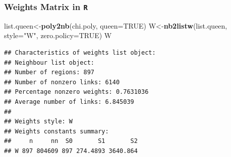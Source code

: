 \documentclass[
  shownotes,
  xcolor={svgnames},
  hyperref={colorlinks,citecolor=DarkBlue,linkcolor=DarkRed,urlcolor=DarkBlue}
  ]{beamer}
\newenvironment{Shaded}{\begin{snugshade}}{\end{snugshade}}
\newcommand{\DataTypeTok}[1]{\textcolor[rgb]{0.13,0.29,0.53}{#1}}
\newcommand{\KeywordTok}[1]{\textcolor[rgb]{0.13,0.29,0.53}{\textbf{#1}}}
\newcommand{\NormalTok}[1]{#1}
\newcommand{\OtherTok}[1]{\textcolor[rgb]{0.56,0.35,0.01}{#1}}
\newcommand{\StringTok}[1]{\textcolor[rgb]{0.31,0.60,0.02}{#1}}
\begin{document}
\begin{frame}[fragile]
\frametitle{Weights Matrix in \texttt{R}}


\begin{scriptsize}
\begin{Shaded}
\begin{Highlighting}[]
\NormalTok{list.queen\textless{}{-}}\KeywordTok{poly2nb}\NormalTok{(chi.poly, }\DataTypeTok{queen=}\OtherTok{TRUE}\NormalTok{)}
\NormalTok{W\textless{}{-}}\KeywordTok{nb2listw}\NormalTok{(list.queen, }\DataTypeTok{style=}\StringTok{"W"}\NormalTok{, }\DataTypeTok{zero.policy=}\OtherTok{TRUE}\NormalTok{)}
\NormalTok{W}
\end{Highlighting}
\end{Shaded}
\end{scriptsize}

\begin{tiny}
\begin{verbatim}
## Characteristics of weights list object:
## Neighbour list object:
## Number of regions: 897 
## Number of nonzero links: 6140 
## Percentage nonzero weights: 0.7631036 
## Average number of links: 6.845039 
## 
## Weights style: W 
## Weights constants summary:
##     n     nn  S0       S1       S2
## W 897 804609 897 274.4893 3640.864
\end{verbatim}

\end{tiny}

\end{frame}
\end{document}
